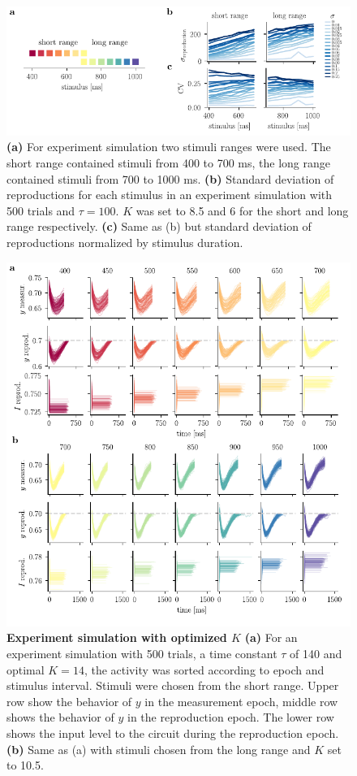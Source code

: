 \documentclass[10pt]{article}
\begin{document}
\begin{figure}[ht]
	\centering
	\includegraphics{figures/supp_interI.pdf}
	\caption{%
	\textbf{(a)} For experiment simulation two stimuli ranges were used. The short range contained stimuli from 400 to 700 ms, the long range contained stimuli from 700 to 1000 ms.
	\textbf{(b)} Standard deviation of reproductions for each stimulus in an experiment simulation with 500 trials and $\tau=100$. $K$ was set to 8.5 and 6 for the short and long range respectively. 
	\textbf{(c)} Same as (b) but standard deviation of reproductions normalized by stimulus duration.
	}
\label{sup:rangeCV}
\end{figure}

\begin{figure}[ht]
	\centering
	\includegraphics{figures/supp_experiment.pdf}
	\caption{\textbf{Experiment simulation with optimized $K$}
	\textbf{(a)} For an experiment simulation with 500 trials, a time constant $\tau$ of 140 and optimal $K=14$, the activity was sorted according to epoch and stimulus interval. Stimuli were chosen from the short range. Upper row show the behavior of $y$ in the measurement epoch, middle row shows the behavior of $y$ in the reproduction epoch. The lower row shows the input level to the circuit during the reproduction epoch. 
	\textbf{(b)} Same as (a) with stimuli chosen from the long range and $K$ set to 10.5. 
	}
\label{sup:experiment}
\end{figure}
\end{document}
